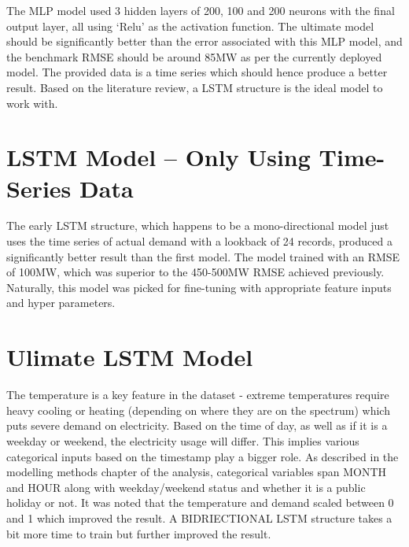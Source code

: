 \documentclass[mstat,12pt]{unswthesis}
\begin{document}
\bigskip

The MLP model used 3 hidden layers of 200, 100 and 200 neurons with the
final output layer, all using `Relu' as the activation function. The
ultimate model should be significantly better than the error associated
with this MLP model, and the benchmark RMSE should be around 85MW as per
the currently deployed model. The provided data is a time series which
should hence produce a better result. Based on the literature review, a
LSTM structure is the ideal model to work with.

\bigskip

\hypertarget{lstm-model-only-using-time-series-data}{%
\section{LSTM Model -- Only Using Time-Series
Data}\label{lstm-model-only-using-time-series-data}}

The early LSTM structure, which happens to be a mono-directional model
just uses the time series of actual demand with a lookback of 24
records, produced a significantly better result than the first model.
The model trained with an RMSE of 100MW, which was superior to the
450-500MW RMSE achieved previously. Naturally, this model was picked for
fine-tuning with appropriate feature inputs and hyper parameters.

\bigskip

\hypertarget{ulimate-lstm-model}{%
\section{Ulimate LSTM Model}\label{ulimate-lstm-model}}

The temperature is a key feature in the dataset - extreme temperatures
require heavy cooling or heating (depending on where they are on the
spectrum) which puts severe demand on electricity. Based on the time of
day, as well as if it is a weekday or weekend, the electricity usage
will differ. This implies various categorical inputs based on the
timestamp play a bigger role. As described in the modelling methods
chapter of the analysis, categorical variables span MONTH and HOUR along
with weekday/weekend status and whether it is a public holiday or not.
It was noted that the temperature and demand scaled between 0 and 1
which improved the result. A BIDRIECTIONAL LSTM structure takes a bit
more time to train but further improved the result.

\bigskip
\end{document}
